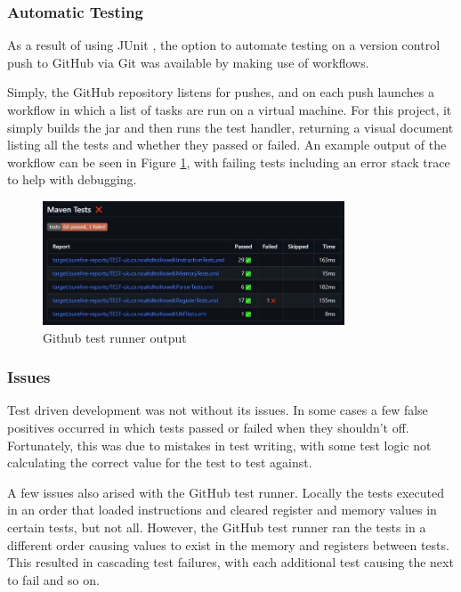 \subsubsection{Automatic Testing}
As a result of using JUnit \cite{junitteam_2019_junit}, the option to automate testing on a version control push to GitHub \cite{github_2013_build} via Git \cite{git_2022_git} was available by making use of workflows.

Simply, the GitHub repository listens for pushes, and on each push launches a workflow in which a list of tasks are run on a virtual machine. For this project, it simply builds the jar and then runs the test handler, returning a visual document listing all the tests and whether they passed or failed. An example output of the workflow can be seen in Figure \ref{fig:github_test_output}, with failing tests including an error stack trace to help with debugging.

\begin{figure}[h]
    \centering
    \includegraphics[width=0.8\textwidth]{dissertation/DATA/githubtest.jpg}
    \caption{Github test runner output}
    \label{fig:github_test_output}
\end{figure}

\subsubsection{Issues}
Test driven development was not without its issues. In some cases a few false positives occurred in which tests passed or failed when they shouldn't off. Fortunately, this was due to mistakes in test writing, with some test logic not calculating the correct value for the test to test against. 

A few issues also arised with the GitHub test runner. Locally the tests executed in an order that loaded instructions and cleared register and memory values in certain tests, but not all. However, the GitHub test runner ran the tests in a different order causing values to exist in the memory and registers between tests. This resulted in cascading test failures, with each additional test causing the next to fail and so on.

